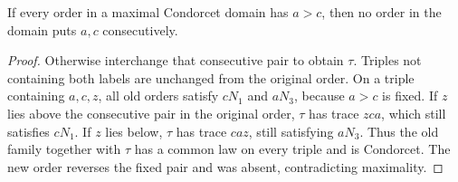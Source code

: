 \begin{lemma}\label{lem:fixedpair}
If every order in a maximal Condorcet domain has \(a>c\), then no
order in the domain puts \(a,c\) consecutively.
\end{lemma}
\begin{proof}
Otherwise interchange that consecutive pair to obtain \(\tau\).
Triples not containing both labels are unchanged from the original
order. On a triple containing \(a,c,z\), all old orders satisfy
\(cN_1\) and \(aN_3\), because \(a>c\) is fixed. If \(z\) lies
above the consecutive pair in the original order, \(\tau\) has trace
\(zca\), which still satisfies \(cN_1\). If \(z\) lies below,
\(\tau\) has trace \(caz\), still satisfying \(aN_3\). Thus the
old family together with \(\tau\) has a common law on every triple
and is Condorcet. The new order reverses the fixed pair and was absent,
contradicting maximality.
\end{proof}

